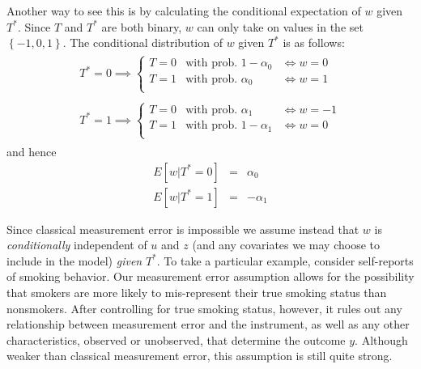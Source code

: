 Another way to see this is by calculating the conditional expectation of $w$ given $T^*$.
Since $T$ and $T^*$ are both binary, $w$ can only take on values in the set $\left\{ -1,0,1 \right\}$.
The conditional distribution of $w$ given $T^*$ is as follows:
\begin{eqnarray*}
  \begin{array}{l}
  T^* = 0 \implies \left\{
  \begin{array}{lll}
    T = 0 & \mbox{with prob. } 1 - \alpha_0& \iff w = 0 \\
    T = 1 & \mbox{with prob. } \alpha_0 & \iff w = 1\\ 
  \end{array}
  \right. \\ \\
  T^* = 1 \implies \left\{
  \begin{array}{lll}
    T = 0 & \mbox{with prob. } \alpha_1& \iff w = -1 \\
    T = 1 & \mbox{with prob. } 1 - \alpha_1 & \iff w = 0\\ 
  \end{array}
  \right.
\end{array}
\end{eqnarray*}
and hence
\begin{eqnarray}
  E[w|T^*=0] &=&  \alpha_0
  \label{eq:wTstar0}\\
  E[w|T^*=1] &=& -\alpha_1
  \label{eq:wTstar1}
\end{eqnarray}

Since classical measurement error is impossible we assume instead that $w$ is \emph{conditionally} independent of $u$ and $z$ (and any covariates we may choose to include in the model) \emph{given} $T^*$.
To take a particular example, consider self-reports of smoking behavior.
Our measurement error assumption allows for the possibility that smokers are more likely to mis-represent their true smoking status than nonsmokers.
After controlling for true smoking status, however, it rules out any relationship between measurement error and the instrument, as well as any other characteristics, observed or unobserved, that determine the outcome $y$.
Although weaker than classical measurement error, this assumption is still quite strong.

